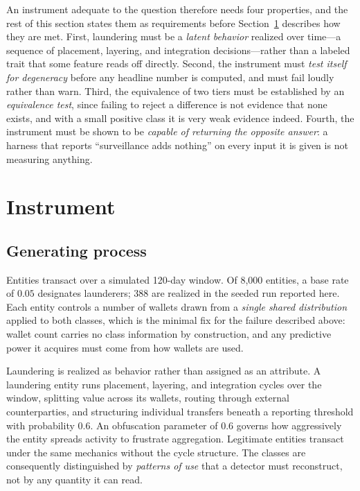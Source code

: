 \documentclass[11pt]{article}
\begin{document}
An instrument adequate to the question therefore needs four properties, and the rest of this
section states them as requirements before Section~\ref{sec:instrument} describes how they are met.
First, laundering must be a \emph{latent behavior} realized over time---a sequence of placement,
layering, and integration decisions---rather than a labeled trait that some feature reads off
directly. Second, the instrument must \emph{test itself for degeneracy} before any headline number
is computed, and must fail loudly rather than warn. Third, the equivalence of two tiers must be
established by an \emph{equivalence test}, since failing to reject a difference is not evidence that
none exists, and with a small positive class it is very weak evidence indeed. Fourth, the instrument
must be shown to be \emph{capable of returning the opposite answer}: a harness that reports
``surveillance adds nothing'' on every input it is given is not measuring anything.


\section{Instrument}
\label{sec:instrument}

\subsection{Generating process}

Entities transact over a simulated 120-day window. Of 8{,}000 entities, a base rate of $0.05$
designates launderers; 388 are realized in the seeded run reported here. Each entity controls a number of
wallets drawn from a \emph{single shared distribution} applied to both classes, which is the
minimal fix for the failure described above: wallet count carries no class information by
construction, and any predictive power it acquires must come from how wallets are used.

Laundering is realized as behavior rather than assigned as an attribute. A laundering entity runs
placement, layering, and integration cycles over the window, splitting value across its wallets,
routing through external counterparties, and structuring individual transfers beneath a reporting
threshold with probability $0.6$. An obfuscation parameter of $0.6$ governs how aggressively the
entity spreads activity to frustrate aggregation. Legitimate entities transact under the same
mechanics without the cycle structure. The classes are consequently distinguished by \emph{patterns
of use} that a detector must reconstruct, not by any quantity it can read.
\end{document}
